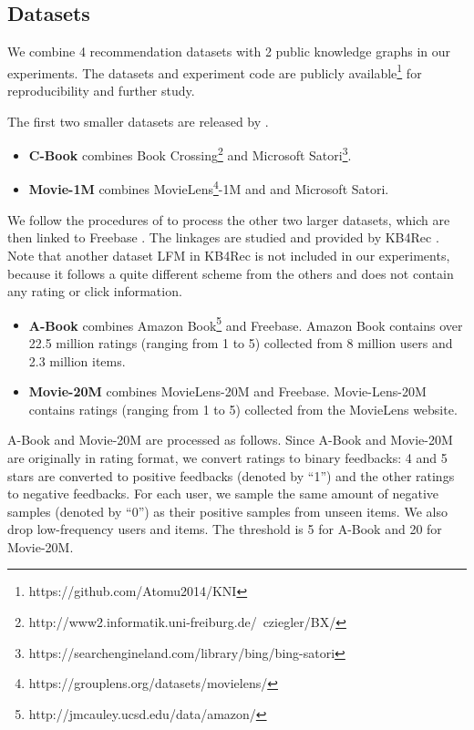 \documentclass[sigconf]{acmart}
\begin{document}
\subsection{Datasets}

We combine 4 recommendation datasets with 2 public knowledge graphs in our experiments. The datasets and experiment code are publicly available\footnote{https://github.com/Atomu2014/KNI} for reproducibility and further study.

The first two smaller datasets are released by \cite{wang2018ripplenet}.

\begin{itemize}
\item \textbf{C-Book} combines Book Crossing\footnote{http://www2.informatik.uni-freiburg.de/~cziegler/BX/} and Microsoft Satori\footnote{https://searchengineland.com/library/bing/bing-satori}.
\item \textbf{Movie-1M} combines MovieLens\footnote{https://grouplens.org/datasets/movielens/}-1M and and Microsoft Satori.
\end{itemize}

We follow the procedures of \cite{wang2018ripplenet} to process the other two larger datasets, which are then linked to Freebase \cite{bollacker2008freebase}. The linkages are studied and provided by KB4Rec \cite{zhao2018kb4rec}. Note that another dataset LFM in KB4Rec is not included in our experiments, because it follows a quite different scheme from the others and does not contain any rating or click information.

\begin{itemize}
\item \textbf{A-Book} combines Amazon Book\footnote{http://jmcauley.ucsd.edu/data/amazon/} and Freebase. Amazon Book \cite{he2016ups}
contains over 22.5 million ratings (ranging from 1 to 5) collected from 8 million users and 2.3 million items.
\item \textbf{Movie-20M} combines MovieLens-20M and Freebase. Movie-Lens-20M contains ratings (ranging from 1 to 5) collected from the MovieLens website.
\end{itemize}

A-Book and Movie-20M are processed as follows.
Since A-Book and Movie-20M are originally in rating format, we convert ratings to binary feedbacks: 4 and 5 stars are converted to positive feedbacks (denoted by ``1'') and the other ratings to negative feedbacks.
For each user, we sample the same amount of negative samples (denoted by ``0'') as their positive samples from unseen items.
We also drop low-frequency users and items.
The threshold is 5 for A-Book and  20 for Movie-20M. 
\end{document}
